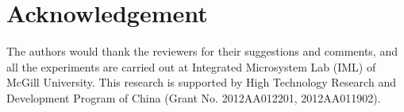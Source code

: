 \documentclass[10pt,journal]{IEEEtran}
\begin{document}
\section*{Acknowledgement}
The authors would thank the reviewers for their suggestions and comments, and all the experiments are carried out at Integrated Microsystem Lab (IML) of McGill University. This research is supported by High Technology Research and Development Program of China (Grant No. 2012AA012201, 2012AA011902).



\end{document}
